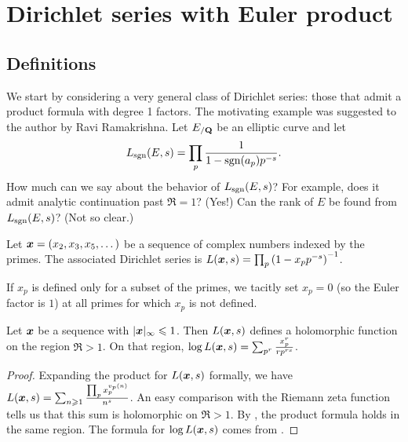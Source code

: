 
\chapter{Dirichlet series with Euler product}\label{ch:Dirichlet-series}





\section{Definitions}

We start by considering a very general class of Dirichlet series: those that 
admit a product formula with degree 1 factors. The motivating example was 
suggested to the author by Ravi Ramakrishna. Let $E_{/\mathbf{Q}}$ be an elliptic 
curve and let 
\[
	L_{\operatorname{sgn}}(E,s) = \prod_p \frac{1}{1-\operatorname{sgn}(a_p) p^{-s}} .
\]
How much can we say about the behavior of $L_{\operatorname{sgn}}(E,s)$? For example, does it 
admit analytic continuation past $\Re = 1$? (Yes!) Can the rank of $E$ be 
found from $L_{\operatorname{sgn}}(E,s)$? (Not so clear.)

\begin{definition}
Let ${\boldsymbol x}=(x_2,x_3,x_5,\dots)$ be a sequence of complex numbers indexed by the 
primes. The associated Dirichlet series is 
$L({\boldsymbol x},s) = \prod_p \left(1- x_p p^{-s}\right)^{-1}$. 
\end{definition}

If $x_p$ is defined only for a subset of the primes, we tacitly set $x_p = 0$ 
(so the Euler factor is $1$) at all primes for which $x_p$ is not defined. 

\begin{lemma}
Let ${\boldsymbol x}$ be a sequence with $|{\boldsymbol x}|_\infty \leqslant 1$. Then $L({\boldsymbol x},s)$ 
defines a holomorphic function on the region $\Re > 1$. On that region, 
$\log L({\boldsymbol x},s) = \sum_{p^r} \frac{x_p^r}{r p^{r s}}$. 
\end{lemma}
\begin{proof}
Expanding the product for $L({\boldsymbol x},s)$ formally, we have 
$L({\boldsymbol x},s) = \sum_{n\geqslant 1} \frac{\prod_p x_p^{v_p(n)}}{n^s}$. 
An easy comparison with the Riemann zeta function tells us that this sum 
is holomorphic on $\Re > 1$. By \cite[Th.~11.7]{apostol-1976}, the 
product formula holds in the same region. The formula for $\log L({\boldsymbol x},s)$ 
comes from \cite[11.9 Ex.~2]{apostol-1976}. 
\end{proof}

